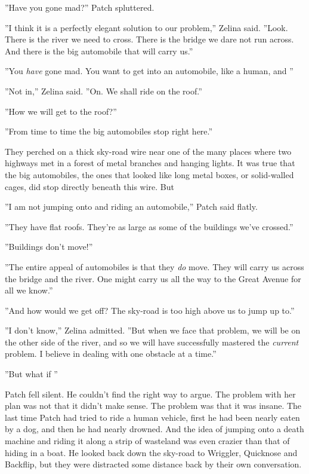 \documentclass[12pt]{book}
\begin{document}
 ''Have you gone mad?'' Patch spluttered.\par
 ''I think it is a perfectly elegant solution to our problem,'' Zelina said. ''Look. There is the river we need to cross. There is the bridge we dare not run across. And there is the big automobile that will carry us.''\par
 ''You {\it have} gone mad. You want to get into an automobile, like a human, and %
''\par
 ''Not in,'' Zelina said. ''On. We shall ride on the roof.''\par
 ''How we will get to the roof?''\par
 ''From time to time the big automobiles stop right here.''\par
They perched on a thick sky-road wire near one of the many places where two highways met in a forest of metal branches and hanging lights. It was true that the big automobiles, the ones that looked like long metal boxes, or solid-walled cages, did stop directly beneath this wire. But %
\par
''I am not jumping onto and riding an automobile,'' Patch said flatly.\par
''They have flat roofs. They're as large as some of the buildings we've crossed.''\par
''Buildings don't move!''\par
''The entire appeal of automobiles is that they {\it do} move. They will carry us across the bridge and the river. One might carry us all the way to the Great Avenue for all we know.''\par
''And how would we get off? The sky-road is too high above us to jump up to.''\par
''I don't know,'' Zelina admitted. ''But when we face that problem, we will be on the other side of the river, and so we will have successfully mastered the {\it current} problem. I believe in dealing with one obstacle at a time.''\par
''But%
what if%
''\par
Patch fell silent. He couldn't find the right way to argue. The problem with her plan was not that it didn't make sense. The problem was that it was insane. The last time Patch had tried to ride a human vehicle, first he had been nearly eaten by a dog, and then he had nearly drowned. And the idea of jumping onto a death machine and riding it along a strip of wasteland was even crazier than that of hiding in a boat. He looked back down the sky-road to Wriggler, Quicknose and Backflip, but they were distracted some distance back by their own conversation.\par
\end{document}
